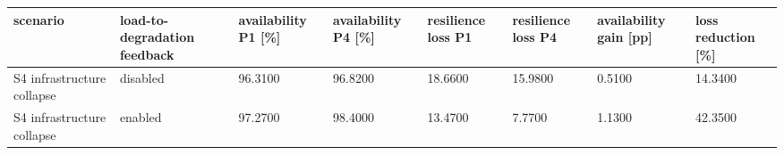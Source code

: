 \begin{tabular}{llllllll}
\toprule
scenario & load-to-degradation feedback & availability P1 [\%] & availability P4 [\%] & resilience loss P1 & resilience loss P4 & availability gain [pp] & loss reduction [\%] \\
\midrule
S4 infrastructure collapse & disabled & 96.3100 & 96.8200 & 18.6600 & 15.9800 & 0.5100 & 14.3400 \\
S4 infrastructure collapse & enabled & 97.2700 & 98.4000 & 13.4700 & 7.7700 & 1.1300 & 42.3500 \\
\bottomrule
\end{tabular}
